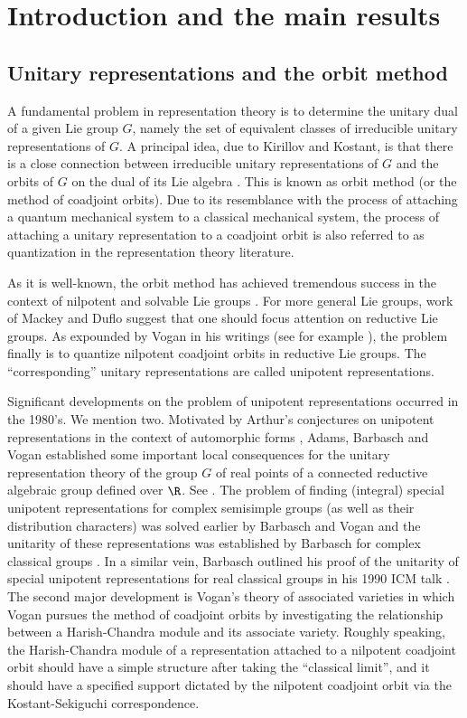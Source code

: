 \documentclass[ssunip.tex]{subfiles}
\begin{document}
\section{Introduction and the main results}\label{sec:intro}

\subsection{Unitary representations and the orbit method}
A fundamental problem in representation theory is to determine the unitary dual
of a given Lie group $G$, namely the set of equivalent classes of irreducible
unitary representations of $G$. A principal idea, due to Kirillov and Kostant,
is that there is a close connection between irreducible unitary representations
of $G$ and the orbits of $G$ on the dual of its Lie algebra \cite{Ki62,Ko70}.
This is known as orbit method (or the method of coadjoint orbits). Due to its
resemblance with the process of attaching a quantum mechanical system to a
classical mechanical system, the process of attaching a unitary representation
to a coadjoint orbit is also referred to as quantization in the representation
theory literature.

As it is well-known, the orbit method has achieved tremendous success in the
context of nilpotent and solvable Lie groups \cite{Ki62,AK}. For more general
Lie groups, work of Mackey and Duflo \cite{Ma,Du82} suggest that one should
focus attention on reductive Lie groups. As expounded by Vogan in his writings
(see for example \cite{VoBook,Vo98,Vo00}), the problem finally is to quantize
nilpotent coadjoint orbits in reductive Lie groups. The ``corresponding''
unitary representations are called unipotent representations.

Significant developments on the problem of unipotent representations occurred in
the 1980's. We mention two. Motivated by Arthur's conjectures on unipotent
representations in the context of automorphic forms \cite{ArPro,ArUni}, Adams,
Barbasch and Vogan established some important local consequences for the unitary
representation theory of the group $G$ of real points of a connected reductive
algebraic group defined over $\R$. See \cite{ABV}. The problem of finding
(integral) special unipotent representations for complex semisimple groups (as
well as their distribution characters) was solved earlier by Barbasch and Vogan
\cite{BVUni} and the unitarity of these representations was established by
Barbasch for complex classical groups \cite{B.Class}. In a similar vein,
Barbasch outlined his proof of the unitarity of special unipotent
representations for real classical groups in his 1990 ICM talk \cite{B.Uni}. The
second major development is Vogan's theory of associated varieties \cite{Vo89}
in which Vogan pursues the method of coadjoint orbits by investigating the
relationship between a Harish-Chandra module and its associate variety. Roughly
speaking, the Harish-Chandra module of a representation attached to a nilpotent
coadjoint orbit should have a simple structure after taking the ``classical
limit'', and it should have a specified support dictated by the nilpotent
coadjoint orbit via the Kostant-Sekiguchi correspondence.
\end{document}
